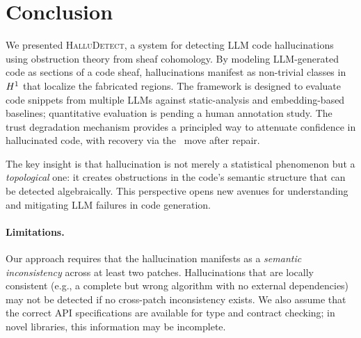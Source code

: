 \documentclass[11pt]{article}
\newcommand{\HalluDetect}{\textsc{HalluDetect}}
\begin{document}
\section{Conclusion}\label{sec:conclusion}

We presented \HalluDetect, a system for detecting LLM code
hallucinations using obstruction theory from sheaf cohomology.
By modeling LLM-generated code as sections of a code sheaf,
hallucinations manifest as non-trivial classes in $H^{1}$
that localize the fabricated regions.  The framework is designed
to evaluate code snippets from multiple LLMs against
static-analysis and embedding-based baselines; quantitative
evaluation is pending a human annotation study.  The trust
degradation mechanism provides a principled way to attenuate
confidence in hallucinated code, with recovery via the \PROMOTE\
move after repair.

The key insight is that hallucination is not merely a statistical
phenomenon but a \emph{topological} one: it creates obstructions in
the code's semantic structure that can be detected algebraically.
This perspective opens new avenues for understanding and mitigating
LLM failures in code generation.

\paragraph{Limitations.}
Our approach requires that the hallucination manifests as a
\emph{semantic inconsistency} across at least two patches.
Hallucinations that are locally consistent (e.g., a complete but
wrong algorithm with no external dependencies) may not be detected
if no cross-patch inconsistency exists.  We also assume that the
correct API specifications are available for type and contract
checking; in novel libraries, this information may be incomplete.
\end{document}
